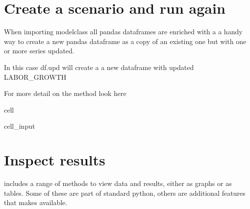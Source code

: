 \documentclass[letterpaper,10pt,english]{jupyterBook}
\begin{document}
\section{Create a scenario and run again}
\label{\detokenize{content/03_Installation/TestingModelFlow:create-a-scenario-and-run-again}}
\begin{sphinxShadowBox}

\sphinxAtStartPar
When importing modelclass all pandas dataframes are enriched with a a handy way to create a new pandas dataframe as a copy of an existing one but with one or more series updated.

\sphinxAtStartPar
In this case df.upd will create a a new dataframe  with updated LABOR\_GROWTH

\sphinxAtStartPar
For more detail on the  method look here 
\end{sphinxShadowBox}

\begin{sphinxuseclass}{cell}\begin{sphinxVerbatimInput}

\begin{sphinxuseclass}{cell_input}
\begin{sphinxVerbatim}[commandchars=\\\{\}]
    
     
\end{sphinxVerbatim}

\end{sphinxuseclass}\end{sphinxVerbatimInput}

\end{sphinxuseclass}

\section{Inspect results}
\label{\detokenize{content/03_Installation/TestingModelFlow:inspect-results}}
\sphinxAtStartPar
{} includes a range of methods to view data and results, either as graphs or as tables.  Some of these are part of standard python, others are additional features that  makes available.
\end{document}
